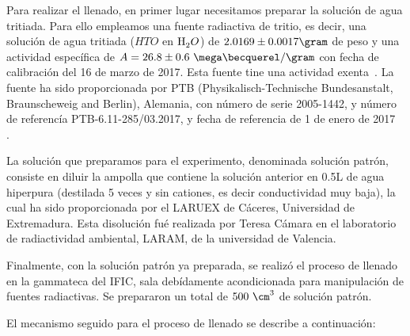 Para realizar el llenado, en primer lugar necesitamos preparar la solución de agua tritiada. Para ello  empleamos una fuente radiactiva de tritio, es decir, una solución de agua tritiada ($HTO$ en $\ce{H_2}O$) de $2.0169 \pm 0.0017\gram$ de peso y una actividad específica de $A=26.8 \pm 0.6~\mega\becquerel/\gram$ con fecha de calibración del 16 de marzo de 2017. Esta fuente tine una actividad  exenta~\cite{IFIC}. La fuente ha sido proporcionada por PTB (Physikalisch-Technische Bundesanstalt, Braunscheweig and Berlin), Alemania, con número de serie 2005-1442, y número de referencía PTB-6.11-285/03.2017, y fecha de referencia de 1 de enero de 2017~\cite{IFIC}
.

La solución que preparamos para el experimento, denominada solución patrón, consiste en diluir la ampolla que contiene la solución anterior en  0.5L de agua hiperpura (destilada 5 veces y sin cationes, es decir conductividad muy baja), la cual ha sido proporcionada por el LARUEX de Cáceres, Universidad de Extremadura. Esta disolución fué realizada por Teresa Cámara en el laboratorio de radiactividad ambiental, LARAM, de la universidad de Valencia.



Finalmente, con la solución patrón ya preparada, se realizó el proceso de llenado en la gammateca del IFIC, sala debídamente acondicionada para manipulación de fuentes radiactivas. Se prepararon un total de $500~\cm^3$ de solución patrón.

El mecanismo seguido para el proceso de llenado se describe a continuación:

